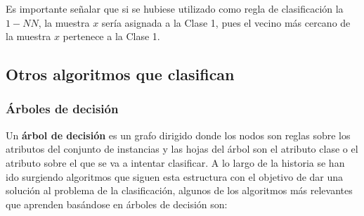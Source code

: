 \documentclass[a4paper, 11pt]{article} %
\begin{document}
\begin{shaded}
Es importante señalar que si se hubiese utilizado como regla de clasificación la $1-NN$, la muestra $x$ sería asignada a la Clase 1, pues el vecino más cercano de la muestra $x$ pertenece a la Clase 1.
\end{shaded}

\subsection{Otros algoritmos que clasifican}
\subsubsection{Árboles de decisión}
Un \textbf{árbol de decisión} es un grafo dirigido donde los nodos son reglas sobre los atributos del conjunto de instancias y las hojas del árbol son el atributo clase o el atributo sobre el que se va a intentar clasificar. A lo largo de la historia se han ido surgiendo algoritmos que siguen esta estructura con el objetivo de dar una solución al problema de la clasificación, algunos de los algoritmos más relevantes que aprenden basándose en árboles de decisión son:
\end{document}
